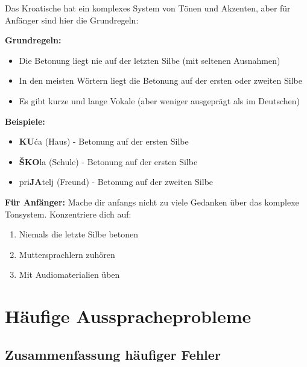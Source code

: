 \begin{tcolorbox}[breakable, colback=white, colframe=croatianred, title=\textbf{Wortbetonung}]

Das Kroatische hat ein komplexes System von Tönen und Akzenten, aber für Anfänger sind hier die Grundregeln:

\textbf{Grundregeln:}
\begin{itemize}
    \item Die Betonung liegt nie auf der letzten Silbe (mit seltenen Ausnahmen)
    \item In den meisten Wörtern liegt die Betonung auf der ersten oder zweiten Silbe
    \item Es gibt kurze und lange Vokale (aber weniger ausgeprägt als im Deutschen)
\end{itemize}

\textbf{Beispiele:}
\begin{itemize}
    \item \textbf{KU}ća (Haus) - Betonung auf der ersten Silbe
    \item \textbf{ŠKO}la (Schule) - Betonung auf der ersten Silbe
    \item pri\textbf{JA}telj (Freund) - Betonung auf der zweiten Silbe
\end{itemize}

\textbf{Für Anfänger:}
Mache dir anfangs nicht zu viele Gedanken über das komplexe Tonsystem. Konzentriere dich auf:
\begin{enumerate}
    \item Niemals die letzte Silbe betonen
    \item Muttersprachlern zuhören
    \item Mit Audiomaterialien üben
\end{enumerate}

\end{tcolorbox}

\section{Häufige Ausspracheprobleme}

\subsection{Zusammenfassung häufiger Fehler}

